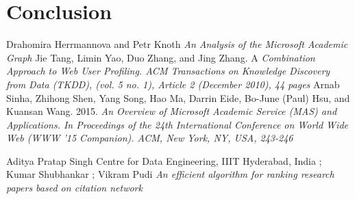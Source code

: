 \documentclass[a4paper, 11pt]{article}
\begin{document}
\section*{Conclusion}




\begin{thebibliography}{9}
Drahomira Herrmannova and Petr Knoth \emph{An Analysis of the Microsoft Academic Graph
}
Jie Tang, Limin Yao, Duo Zhang, and Jing Zhang. A \emph{ Combination Approach to Web User Profiling. ACM Transactions on Knowledge Discovery from Data (TKDD), (vol. 5 no. 1), Article 2 (December 2010), 44 pages}
Arnab Sinha, Zhihong Shen, Yang Song, Hao Ma, Darrin Eide, Bo-June (Paul) Hsu, and Kuansan Wang. 2015. \emph{An Overview of Microsoft Academic Service (MAS) and Applications. In Proceedings of the 24th International Conference on World Wide Web (WWW ’15 Companion). ACM, New York, NY, USA, 243-246}

Aditya Pratap Singh 
Centre for Data Engineering, IIIT Hyderabad, India
; Kumar Shubhankar ; Vikram Pudi \emph{An efficient algorithm for ranking research papers based on citation network
}

\end{thebibliography}
\end{document}
